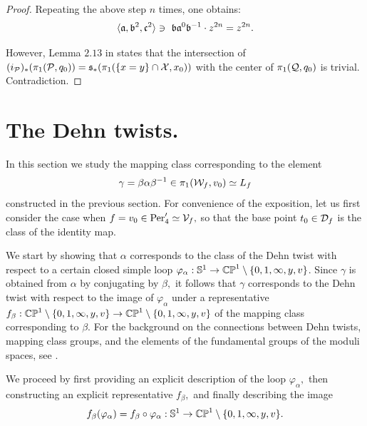 \documentclass{article}
\begin{document}
\begin{proof}
Repeating the above step $n$ times, one obtains:
$$
\langle \mathfrak{a},\mathfrak{b}^2,\mathfrak{c}^2\rangle\ni\ \mathfrak{b}\mathfrak{a}^0\mathfrak{b}^{-1}\cdot z^{2n}=z^{2n}.
$$

However, Lemma $2.13$ in \cite{HK} states that the intersection of $(i_{\mathcal{P}})_*(\pi_1(\mathcal{P},q_0))=\mathfrak{s}_*(\pi_1(\{x=y\}\cap \mathcal{X},x_0))$ with the center of $\pi_1(\mathcal{Q},q_0)$ is trivial. Contradiction.



\end{proof}

\section{The Dehn twists.}

In this section we study the mapping class corresponding to the element 
$$
\gamma=\beta\alpha\beta^{-1}\in \pi_1(\mathcal{W}_f,v_0)\simeq L_f
$$ 
constructed in the previous section. For convenience of the exposition, let us first consider the case when $f=v_0\in \operatorname{Per}'_4\simeq \mathcal{V}_f,$ so that the base point $t_0\in\mathcal{D}_f$ is the class of the identity map.

We start by showing that $\alpha$ corresponds to the class of the Dehn twist with respect to a certain closed simple loop $\varphi_\alpha:\mathbb{S}^1\to \mathbb{CP}^1\setminus \{0,1,\infty,y,v\}$. Since $\gamma$ is obtained from $\alpha$ by conjugating by $\beta,$ it follows that $\gamma$ corresponds to the Dehn twist with respect to the image of $\varphi_\alpha$ under a representative $f_\beta:\mathbb{CP}^1\setminus \{0,1,\infty,y,v\}\to \mathbb{CP}^1\setminus \{0,1,\infty,y,v\}$ of the mapping class corresponding to $\beta.$ For the background on the connections between Dehn twists, mapping class groups, and the elements of the fundamental groups of the moduli spaces, see \cite{B,FM}.

We proceed by first providing an explicit description of the loop $\varphi_\alpha,$ then constructing an explicit representative $f_\beta,$ and finally describing the image 
$$
f_\beta(\varphi_\alpha)=f_\beta\circ\varphi_\alpha:\mathbb{S}^1\to \mathbb{CP}^1\setminus \{0,1,\infty,y,v\}.
$$
\end{document}
